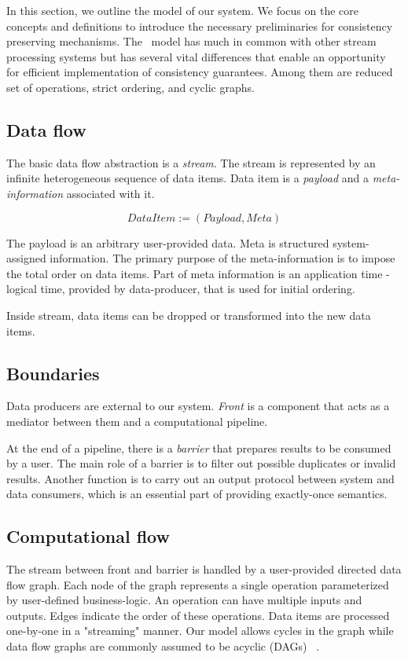 
\label {fs-model-section}

In this section, we outline the model of our system. We focus on the core concepts and definitions to introduce the necessary preliminaries for consistency preserving mechanisms. The \FlameStream\ model has much in common with other stream processing systems but has several vital differences that enable an opportunity for efficient implementation of consistency guarantees. Among them are reduced set of operations, strict ordering, and cyclic graphs.

\subsection{Data flow}
The basic data flow abstraction is a {\it stream}. The stream is represented by an infinite heterogeneous sequence of data items. Data item is a {\it payload} and a {\it meta-information} associated with it. 

\[DataItem := (Payload, Meta)\]

The payload is an arbitrary user-provided data. Meta is structured system-assigned information. The primary purpose of the meta-information is to impose the total order on data items. Part of meta information is an application time - logical time, provided by data-producer, that is used for initial ordering.

Inside stream, data items can be dropped or transformed into the new data items.

\subsection{Boundaries}
Data producers are external to our system. {\em Front} is a component that acts as a mediator between them and a computational pipeline.

At the end of a pipeline, there is a {\em barrier} that prepares results to be consumed by a user. The main role of a barrier is to filter out possible duplicates or invalid results. Another function is to carry out an output protocol between system and data consumers, which is an essential part of providing exactly-once semantics.

\subsection{Computational flow}
The stream between front and barrier is handled by a user-provided directed data flow graph. Each node of the graph represents a single operation parameterized by user-defined business-logic. An operation can have multiple inputs and outputs. Edges indicate the order of these operations. Data items are processed one-by-one in a "streaming" manner. Our model allows cycles in the graph while data flow graphs are commonly assumed to be acyclic (DAGs) 
~\cite{Zaharia:2016:ASU:3013530.2934664, Carbone:2017:SMA:3137765.3137777}.


